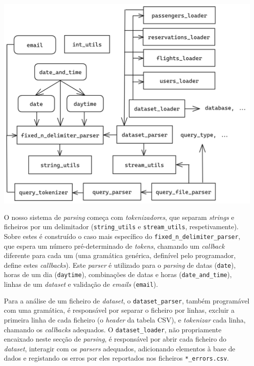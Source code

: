 \documentclass[12pt, a4paper]{article}
\begin{document}
\begin{center}
	\includegraphics[scale=0.17]{res/parsing.png}
\end{center}

O nosso sistema de \emph{parsing} começa com \emph{tokenizadores}, que separam \emph{strings} e
ficheiros por um delimitador (\texttt{string\_utils} e \texttt{stream\_utils}, respetivamente).
Sobre estes é construído o caso mais específico do \texttt{fixed\_n\_delimiter\_parser}, que espera
um número pré-determinado de \emph{tokens}, chamando um \emph{callback} diferente para cada um (uma
gramática genérica, definível pelo programador, define estes \emph{callbacks}). Este \emph{parser}
é utilizado para o \emph{parsing} de datas (\texttt{date}), horas de um dia (\texttt{daytime}),
combinações de datas e horas (\texttt{date\_and\_time}), linhas de um \emph{dataset} e validação de
\emph{emails} (\texttt{email}).

Para a análise de um ficheiro de \emph{dataset}, o \texttt{dataset\_parser}, também programável com
uma gramática, é responsável por separar o ficheiro por linhas, excluir a primeira linha de cada
ficheiro (o \emph{header} da tabela CSV), e \emph{tokenizar} cada linha, chamando os
\emph{callbacks} adequados. O \texttt{dataset\_loader}, não propriamente encaixado neste secção de
\emph{parsing}, é responsável por abrir cada ficheiro do \emph{dataset}, interagir com os
\emph{parsers} adequados, adicionando elementos à base de dados e registando os erros por eles
reportados nos ficheiros \texttt{*\_errors.csv}.
\end{document}
